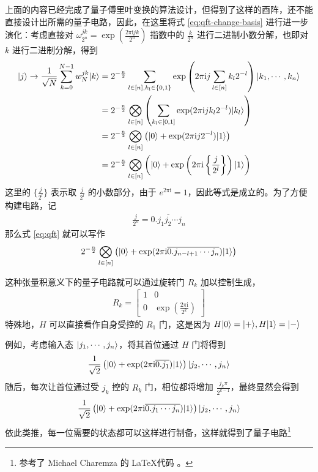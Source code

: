 上面的内容已经完成了量子傅里叶变换的算法设计，但得到了这样的酉阵，还不能直接设计出所需的量子电路，因此，在这里将式 \ref{eq:qft-change-basis} 进行进一步演化：考虑直接对 $\omega_{2^n}^{jk}=\exp(\frac{2\pi\mathrm{i} jk}{2^n})$ 指数中的 $\frac{k}{2^n}$ 进行二进制小数分解，也即对 $k$ 进行二进制分解，得到 \begin{align}\begin{aligned}
        |j\rangle\to\frac{1}{\sqrt{N}}\sum_{k=0}^{N-1}w_N^{jk}|k\rangle
         & =2^{-\frac{n}{2}}\sum_{l\in[n],k_l\in\{0,1\}}\exp\left(2\pi\mathrm{i} j\sum_{l\in[n]}k_l2^{-l}\right)|k_1,\cdots,k_n\rangle                  \\
         & =2^{-\frac{n}{2}}\bigotimes_{l\in[n]}\left(\sum_{k_l\in[0,1]}\exp(2\pi\mathrm{i} jk_l2^{-l})|k_l\rangle\right)                               \\
         & =2^{-\frac{n}{2}}\bigotimes_{l\in[n]}\left(|0\rangle+\exp(2\pi\mathrm{i} j2^{-l})|1\rangle\right)                                              \\
         & =2^{-\frac{n}{2}}\bigotimes_{l\in[n]}\left(|0\rangle+\exp\left(2\pi\mathrm{i}\left\{\frac{j}{2^l}\right\}\right)|1\rangle\right)\label{eq:qft}
    \end{aligned}\end{align}
这里的 $\{\frac{j}{2^l}\}$ 表示取 $\frac{j}{2^l}$ 的小数部分，由于 $e^{2\pi\mathrm{i}}=1$，因此等式是成立的。为了方便构建电路，记 \begin{align}
    \frac{j}{2^n}=\overline{0.j_1 j_2\cdots j_n}
\end{align}
那么式 \ref{eq:qft} 就可以写作 \begin{align*}
    2^{-\frac{n}{2}}\bigotimes_{l\in[n]}\left(|0\rangle+\exp(2\pi\mathrm{i}\overline{0.j_{n-l+1}\cdots j_{n}})|1\rangle\right)
\end{align*}

这种张量积意义下的量子电路就可以通过旋转门 $R_k$ 加以控制生成，\begin{align}
    R_k=\begin{bmatrix}
            1 & 0                                           \\
            0 & \exp\left(\frac{2\pi\mathrm{i}}{2^k}\right)
        \end{bmatrix}
\end{align}
特殊地，$H$ 可以直接看作自身受控的 $R_1$ 门，这是因为 $H|0\rangle=|+\rangle,H|1\rangle=|-\rangle$

例如，考虑输入态 $|j_1,\cdots,j_n\rangle$，将其首位通过 $H$ 门将得到 \begin{align}
    \frac{1}{\sqrt{2}}\left(|0\rangle+\exp(2\pi\mathrm{i}\overline{0.j_1})|1\rangle\right)|j_2,\cdots,j_n\rangle
\end{align}
随后，每次让首位通过受 $j_k$ 控的 $R_k$ 门，相位都将增加 $\frac{j_k\pi}{2^{k-1}}$，最终显然会得到 \begin{align}
    \frac{1}{\sqrt{2}}\left(|0\rangle+\exp(2\pi\mathrm{i}\overline{0.j_1\cdots j_n})|1\rangle\right)|j_2,\cdots,j_n\rangle
\end{align}
依此类推，每一位需要的状态都可以这样进行制备，这样就得到了量子电路\footnote{参考了 Michael Charemza 的 \LaTeX 代码 \cite{charemza2006examples}。}

